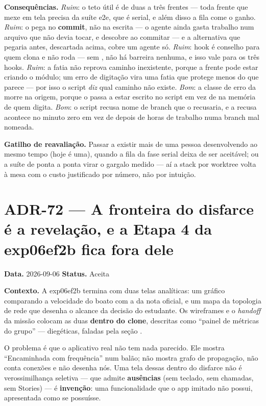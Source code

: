 \textbf{Consequências.} \emph{Ruim}: o teto útil é de duas a três frentes ---
toda frente que mexe em tela precisa da suíte e2e, que é serial, e além disso a
fila come o ganho. \emph{Ruim}: o  pega no \textbf{commit}, não na
escrita --- o agente ainda gasta trabalho num arquivo que não devia tocar, e
descobre ao commitar --- e a alternativa que pegaria antes, descartada acima,
cobre um agente só. \emph{Ruim}: hook é conselho para quem clona e não roda
 --- sem , não há barreira nenhuma, e isso
vale para os três hooks. \emph{Ruim}: a fatia não reprova caminho inexistente,
porque a frente pode estar criando o módulo; um erro de digitação vira uma fatia
que protege menos do que parece --- por isso o script \emph{diz} qual caminho
não existe. \emph{Bom}: a classe de erro da  morre na origem,
porque o  passa a estar escrito no script em vez de na memória de
quem digita. \emph{Bom}: o script recusa nome de branch que o 
recusaria, e a recusa acontece no minuto zero em vez de depois de horas de
trabalho numa branch mal nomeada.

\textbf{Gatilho de reavaliação.} Passar a existir mais de uma pessoa
desenvolvendo ao mesmo tempo (hoje é uma), quando a fila da fase serial deixa de
ser aceitável; ou a suíte de ponta a ponta virar o gargalo medido --- aí a stack
por worktree volta à mesa com o custo justificado por número, não por intuição.

\section{ADR-72 --- A fronteira do disfarce é a revelação, e a Etapa 4 da
exp06ef2b fica fora dele}
\label{adr:72}

\textbf{Data.} 2026-09-06 \quad \textbf{Status.} Aceita

\textbf{Contexto.} A exp06ef2b termina com duas telas analíticas: um gráfico
comparando a velocidade do boato com a da nota oficial, e um mapa da topologia
de rede que desenha o alcance da decisão do estudante. Os wireframes e o
\emph{handoff} da missão colocam as duas \textbf{dentro do clone}, descritas
como \enquote{painel de métricas do grupo} --- diegéticas, faladas pela seção
.

O problema é que o aplicativo real não tem nada parecido. Ele mostra
\enquote{Encaminhada com frequência} num balão; não mostra grafo de propagação,
não conta conexões e não desenha nós. Uma tela dessas dentro do disfarce não é
verossimilhança seletiva --- que admite \textbf{ausências} (sem teclado, sem
chamadas, sem Stories) --- é \textbf{invenção}: uma funcionalidade que o app
imitado não possui, apresentada como se possuísse.

